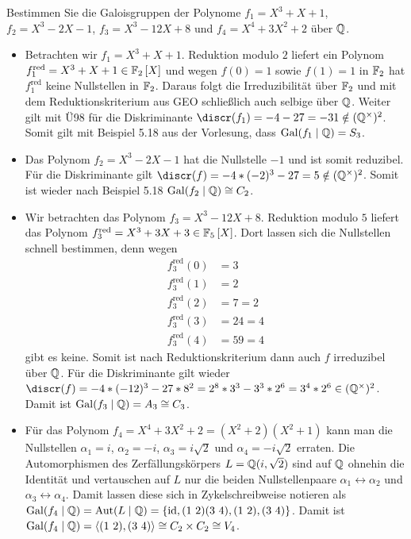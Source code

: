 \begin{exercisePage}
	
	\setcounter{taskcount}{100}
	
	\begin{exercise}
		Bestimmen Sie die Galoisgruppen der Polynome $f_1 = X^3 + X + 1$, $f_2 = X^3 -2X - 1$, $f_3 = X^3 - 12X + 8$ und $f_4 = X^4 + 3X^2 +2$ über $\mathbb{Q}$.
	\end{exercise}

	\begin{itemize}[leftmargin=*]
		\item Betrachten wir $f_1 = X^3 + X + 1$. Reduktion modulo $2$ liefert ein Polynom $f_1^{\text{red}} = X^3 + X + 1 \in \polynom[\F_2]$ und wegen $f(0) = 1$ sowie $f(1) = 1$ in $\mathbb{F}_2$ hat $f_1^{\text{red}}$ keine Nullstellen in $\mathbb{F}_2$. Daraus folgt die Irreduzibilität über $\mathbb{F}_2$ und mit dem Reduktionskriterium aus GEO schließlich auch selbige über $\mathbb{Q}$. Weiter gilt mit Ü98 für die Diskriminante $\discr(f_1) = -4 - 27 = -31 \notin (\einheit{\Q})^2$. Somit gilt mit Beispiel 5.18 aus der Vorlesung, dass $\operatorname{Gal}(f_1 \mid \mathbb{Q}) = S_3$.
		\item Das Polynom $f_2 = X^3 - 2X - 1$ hat die Nullstelle $-1$ und ist somit reduzibel. Für die Diskriminante gilt $\discr(f) = -4 * (-2)^3 -27 = 5 \notin (\einheit{\Q})^2$. Somit ist wieder nach Beispiel 5.18 $\operatorname{Gal}(f_2 \mid \mathbb{Q}) \mathrel{\cong} C_2$.
		\item Wir betrachten das Polynom $f_3 = X^3 - 12X + 8$. Reduktion modulo $5$ liefert das Polynom $f_3^{\text{red}} = X^3 + 3 X + 3 \in \polynom[\F_5]$. Dort lassen sich die Nullstellen schnell bestimmen, denn wegen
		\begin{equation*}
			\begin{aligned}
			f_3^{\text{red}}(0) &= 3 \\
			f_3^{\text{red}}(1) &= 2 \\
			f_3^{\text{red}}(2) &= 7  = 2 \\
			f_3^{\text{red}}(3) &= 24 = 4 \\
			f_3^{\text{red}}(4) &= 59 = 4
			\end{aligned}
		\end{equation*}
		gibt es keine. Somit ist nach Reduktionskriterium dann auch $f$ irreduzibel über $\mathbb{Q}$. Für die Diskriminante gilt wieder $\discr(f) = -4 * (-12)^3 - 27 * 8^2 = 2^8 * 3^3 - 3^3 * 2^6 = 3^4 * 2^6 \in (\einheit{\Q})^2$. Damit ist $\operatorname{Gal}(f_3 \mid \mathbb{Q}) = A_3 \mathrel{\cong} C_3$.
		\item Für das Polynom $f_4 = X^4 + 3X^2 + 2 = (X^2 + 2)(X^2 + 1)$ kann man die Nullstellen $\alpha_1 = i$, $\alpha_2 = -i$, $\alpha_3 = i \sqrt{2}$ und $\alpha_4 = -i \sqrt{2}$ erraten. Die Automorphismen des Zerfällungskörpers $L = \mathbb{Q}(i,\sqrt2)$ sind auf $\mathbb{Q}$ ohnehin die Identität und vertauschen auf $L$ nur die beiden Nullstellenpaare $\alpha_1 \leftrightarrow \alpha_2$ und $\alpha_3 \leftrightarrow \alpha_4$. Damit lassen diese sich in Zykelschreibweise notieren als $\operatorname{Gal}(f_4 \mid \mathbb{Q}) = \operatorname{Aut}(L \mid \mathbb{Q}) = \left\{ \operatorname{id}, (1 \ 2)(3 \ 4), (1 \ 2), (3 \ 4) \right\}$. Damit ist $\operatorname{Gal}(f_4 \mid \mathbb{Q}) = \langle (1 \ 2), (3 \ 4) \rangle \mathrel{\cong} C_2 \times C_2 \mathrel{\cong} V_4$. 
	\end{itemize}


\end{exercisePage}
